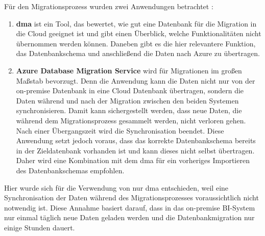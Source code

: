 Für den Migrationsprozess wurden zwei Anwendungen betrachtet \cite{soh_microsoft_2020}: 
\begin{enumerate}
\item \textbf{\ac{dma}} ist ein Tool, das bewertet, wie gut eine Datenbank für die Migration in die Cloud geeignet ist und gibt einen Überblick, welche Funktionalitäten nicht übernommen werden können. Daneben gibt es die hier relevantere Funktion, das Datenbankschema und anschließend die Daten nach Azure zu übertragen. 
\item \textbf{Azure Database Migration Service} wird für Migrationen im großen Maßstab bevorzugt. Denn die Anwendung kann die Daten nicht nur von der on-premise Datenbank in eine Cloud Datenbank übertragen, sondern die Daten während und nach der Migration zwischen den beiden Systemen synchronisieren. Damit kann sichergestellt werden, dass neue Daten, die während dem Migrationsprozess gesammelt werden, nicht verloren gehen. Nach einer Übergangszeit wird die Synchronisation beendet. Diese Anwendung setzt jedoch voraus, dass das korrekte Datenbankschema bereits in der Zieldatenbank vorhanden ist und kann dieses nicht selbst übertragen. Daher wird eine Kombination mit dem \ac{dma} für ein vorheriges Importieren des Datenbankschemas empfohlen.
\end{enumerate}
Hier wurde sich für die Verwendung von nur \ac{dma} entschieden, weil eine Synchronisation der Daten während des Migrationsprozesses voraussichtlich nicht notwendig ist. Diese Annahme basiert darauf, dass in das on-premise BI-System nur einmal täglich neue Daten geladen werden und die Datenbankmigration nur einige Stunden dauert.

